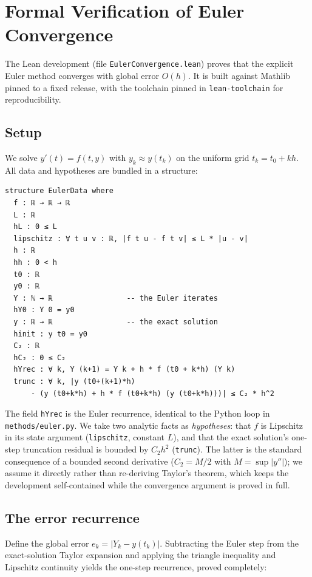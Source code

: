 \documentclass[sigplan,nonacm,screen]{acmart}
\begin{document}
\section{Formal Verification of Euler Convergence}
\label{sec:lean}

The Lean development (file \texttt{EulerConvergence.lean}) proves that the
explicit Euler method converges with global error $O(h)$. It is built against
Mathlib pinned to a fixed release, with the toolchain pinned in
\texttt{lean-toolchain} for reproducibility.

\subsection{Setup}
We solve $y'(t) = f(t, y)$ with $y_k \approx y(t_k)$ on the uniform grid
$t_k = t_0 + kh$. All data and hypotheses are bundled in a structure:

\begin{lstlisting}[language=lean]
structure EulerData where
  f : ℝ → ℝ → ℝ
  L : ℝ
  hL : 0 ≤ L
  lipschitz : ∀ t u v : ℝ, |f t u - f t v| ≤ L * |u - v|
  h : ℝ
  hh : 0 < h
  t0 : ℝ
  y0 : ℝ
  Y : ℕ → ℝ                 -- the Euler iterates
  hY0 : Y 0 = y0
  y : ℝ → ℝ                 -- the exact solution
  hinit : y t0 = y0
  C₂ : ℝ
  hC₂ : 0 ≤ C₂
  hYrec : ∀ k, Y (k+1) = Y k + h * f (t0 + k*h) (Y k)
  trunc : ∀ k, |y (t0+(k+1)*h)
      - (y (t0+k*h) + h * f (t0+k*h) (y (t0+k*h)))| ≤ C₂ * h^2
\end{lstlisting}

The field \texttt{hYrec} is the Euler recurrence, identical to the Python loop in
\texttt{methods/euler.py}. We take two analytic facts as \emph{hypotheses}: that
$f$ is Lipschitz in its state argument (\texttt{lipschitz}, constant $L$), and
that the exact solution's one-step truncation residual is bounded by $C_2 h^2$
(\texttt{trunc}). The latter is the standard consequence of a bounded second
derivative ($C_2 = M/2$ with $M = \sup |y''|$); we assume it directly rather than
re-deriving Taylor's theorem, which keeps the development self-contained while the
convergence argument is proved in full.

\subsection{The error recurrence}
Define the global error $e_k = |Y_k - y(t_k)|$. Subtracting the Euler step from
the exact-solution Taylor expansion and applying the triangle inequality and
Lipschitz continuity yields the one-step recurrence, proved completely:
\end{document}
